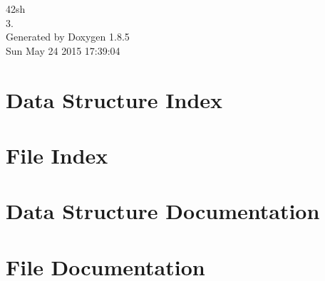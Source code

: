 \documentclass[twoside]{book}
\newcommand{\clearemptydoublepage}{%
  \newpage{\pagestyle{empty}\cleardoublepage}%
}
\begin{document}
\begin{titlepage}
\vspace*{7cm}
\begin{center}%
{\Large 42sh \\[1ex]\large 3. }\\
\vspace*{1cm}
{\large Generated by Doxygen 1.8.5}\\
\vspace*{0.5cm}
{\small Sun May 24 2015 17:39:04}\\
\end{center}
\end{titlepage}
\clearemptydoublepage
\tableofcontents
\clearemptydoublepage
{}

\chapter{Data Structure Index}

\chapter{File Index}

\chapter{Data Structure Documentation}










\chapter{File Documentation}
































































\newpage
{}
{}
\printindex
\end{document}
